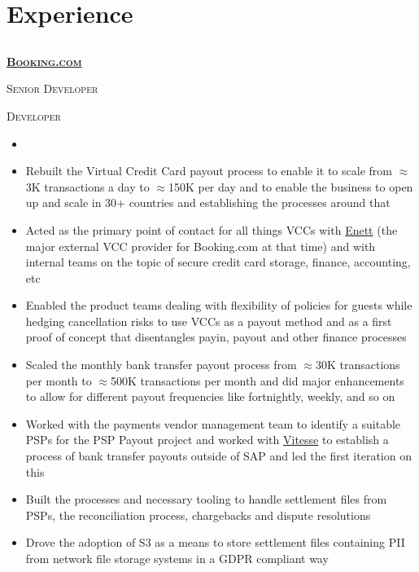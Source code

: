 \documentclass{article}
\begin{document}
\section{Experience}
\subsection[Booking.com]{}
{\raggedright{\textsc{\textbf{\href{https://www.booking.com/}{Booking.com}}}}} \hfill {}

{\raggedright{\textsc{Senior Developer}}} \hfill {}

{\raggedright{\textsc{Developer}}} \hfill {}

\begin{itemize}[noitemsep,nolistsep]
\item <todo: fill in this part>
\item Rebuilt the Virtual Credit Card payout process to enable it to scale from $\approx$3K transactions a day to $\approx$150K per day and to enable the business to open up and scale in 30+ countries and establishing the processes around that
\item Acted as the primary point of contact for all things VCCs with \href{https://www.enett.com/}{Enett} (the major external VCC provider for Booking.com at that time) and with internal teams on the topic of secure credit card storage, finance, accounting, etc
\item Enabled the product teams dealing with flexibility of policies for guests while hedging cancellation risks to use VCCs as a payout method and as a first proof of concept that disentangles payin, payout and other finance processes
\item Scaled the monthly bank transfer payout process from $\approx$30K transactions per month to $\approx$500K transactions per month and did major enhancements to allow for different payout frequencies like fortnightly, weekly, and so on
\item Worked with the payments vendor management team to identify a suitable PSPs for the PSP Payout project and worked with \href{https://vitessepsp.com/}{Vitesse} to establish a process of bank transfer payouts outside of SAP and led the first iteration on this
\item Built the processes and necessary tooling to handle settlement files from PSPs, the reconciliation process, chargebacks and dispute resolutions
\item Drove the adoption of S3 as a means to store settlement files containing PII from network file storage systems in a GDPR compliant way

\end{itemize}
\end{document}

